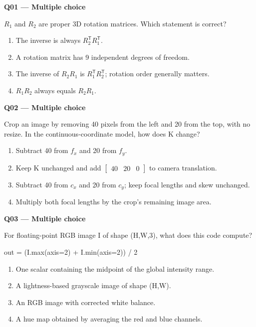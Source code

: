 \documentclass[11pt,a4paper]{article}
\begin{document}
\begin{minipage}{\linewidth}
\textbf{Q01 — Multiple choice}\par\smallskip
\(R_1\) and \(R_2\) are proper 3D rotation matrices. Which statement is correct?
\begin{enumerate}[label=\textbf{\Alph*.}]
\item The inverse is always \(R_2^{\mathsf T}R_1^{\mathsf T}\).
\item A rotation matrix has 9 independent degrees of freedom.
\item The inverse of \(R_2 R_1\) is \(R_1^{\mathsf T}R_2^{\mathsf T}\); rotation order generally matters.
\item \(R_1 R_2\) always equals \(R_2 R_1\).
\end{enumerate}
\end{minipage}
\par\vspace{12pt}
\begin{minipage}{\linewidth}
\textbf{Q02 — Multiple choice}\par\smallskip
Crop an image by removing 40 pixels from the left and 20 from the top,\allowbreak{} with no resize. In the continuous-coordinate model,\allowbreak{} how does K change?
\begin{enumerate}[label=\textbf{\Alph*.}]
\item Subtract 40 from \(f_x\) and 20 from \(f_y\).
\item Keep K unchanged and add \(\begin{bmatrix}40&20&0\end{bmatrix}\) to camera translation.
\item Subtract 40 from \(c_x\) and 20 from \(c_y\); keep focal lengths and skew unchanged.
\item Multiply both focal lengths by the crop's remaining image area.
\end{enumerate}
\end{minipage}
\par\vspace{12pt}
\begin{minipage}{\linewidth}
\textbf{Q03 — Multiple choice}\par\smallskip
For floating-point RGB image I of shape (H,\allowbreak{}W,\allowbreak{}3),\allowbreak{} what does this code compute?


\begin{Code}
out = (I.max(axis=2) + I.min(axis=2)) / 2
\end{Code}

\begin{enumerate}[label=\textbf{\Alph*.}]
\item One scalar containing the midpoint of the global intensity range.
\item A lightness-based grayscale image of shape (H,\allowbreak{}W).
\item An RGB image with corrected white balance.
\item A hue map obtained by averaging the red and blue channels.
\end{enumerate}
\end{minipage}
\end{document}
